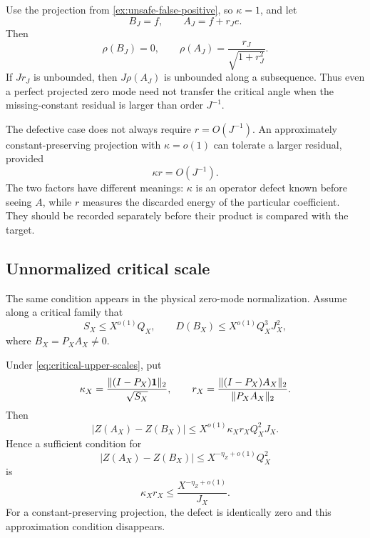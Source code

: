 \begin{example}
\label{ex:J-failure}
Use the projection from
\cref{ex:unsafe-false-positive}, so \(\kappa=1\), and let
\[
 B_J=f,\qquad
 A_J=f+r_Je.
\]
Then
\[
 \rho(B_J)=0,\qquad
 \rho(A_J)=\frac{r_J}{\sqrt{1+r_J^2}}.
\]
If \(Jr_J\) is unbounded, then \(J\rho(A_J)\) is unbounded along a
subsequence.  Thus even a perfect projected zero mode need not
transfer the critical angle when the missing-constant residual is
larger than order \(J^{-1}\).
\end{example}

\begin{remark}
\label{rem:product-tradeoff}
The defective case does not always require
\(r=O(J^{-1})\).  An approximately constant-preserving projection
with \(\kappa=o(1)\) can tolerate a larger residual, provided
\[
 \kappa r=O(J^{-1}).
\]
The two factors have different meanings: \(\kappa\) is an operator
defect known before seeing \(A\), while \(r\) measures the discarded
energy of the particular coefficient.  They should be recorded
separately before their product is compared with the target.
\end{remark}

\subsection{Unnormalized critical scale}

The same condition appears in the physical zero-mode normalization.
Assume along a critical family that
\begin{equation}
 S_X\le X^{o(1)}Q_X,\qquad
 D(B_X)\le X^{o(1)}Q_X^3J_X^2,
\label{eq:critical-upper-scales}
\end{equation}
where \(B_X=P_XA_X\ne0\).

\begin{proposition}
\label{prop:Q2-defect}
Under \eqref{eq:critical-upper-scales}, put
\[
 \kappa_X
 =
 \frac{\|(I-P_X)\mathbf 1\|_2}{\sqrt{S_X}},
\qquad
 r_X
 =
 \frac{\|(I-P_X)A_X\|_2}{\|P_XA_X\|_2}.
\]
Then
\begin{equation}
 |Z(A_X)-Z(B_X)|
 \le
 X^{o(1)}\kappa_Xr_X Q_X^2J_X.
\label{eq:Q2-defect}
\end{equation}
Hence a sufficient condition for
\[
 |Z(A_X)-Z(B_X)|
 \le X^{-\eta_Z+o(1)}Q_X^2
\]
is
\begin{equation}
 \boxed{
 \kappa_Xr_X
 \le
 \frac{X^{-\eta_Z+o(1)}}{J_X}.}
\label{eq:physical-product-target}
\end{equation}
For a constant-preserving projection, the defect is identically
zero and this approximation condition disappears.
\end{proposition}

